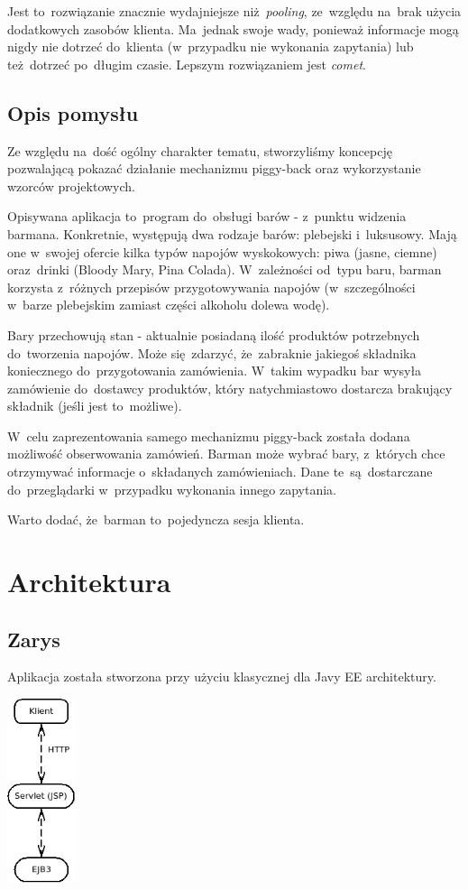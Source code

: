 \documentclass[11pt]{aghdpl}
\begin{document}
Jest to~rozwiązanie znacznie wydajniejsze niż~\textit{pooling}, ze~względu na~brak użycia dodatkowych zasobów klienta. Ma~jednak swoje wady, ponieważ informacje mogą nigdy nie dotrzeć do~klienta (w~przypadku nie wykonania zapytania) lub też~dotrzeć po~długim czasie. Lepszym rozwiązaniem jest \textit{comet}.

\section{Opis pomysłu}
Ze względu na~dość ogólny charakter tematu, stworzyliśmy koncepcję pozwalającą pokazać działanie mechanizmu piggy-back oraz wykorzystanie wzorców projektowych.

Opisywana aplikacja to~program do~obsługi barów - z~punktu widzenia barmana. Konkretnie, występują dwa rodzaje barów: plebejski i~luksusowy. Mają one w~swojej ofercie kilka typów napojów wyskokowych: piwa (jasne, ciemne) oraz~drinki (Bloody Mary, Pina Colada). W~zależności od~typu baru, barman korzysta z~różnych przepisów przygotowywania napojów (w~szczególności w~barze plebejskim zamiast części alkoholu dolewa wodę). 

Bary przechowują stan - aktualnie posiadaną ilość produktów potrzebnych do~tworzenia napojów. Może się~zdarzyć, że~zabraknie jakiegoś składnika koniecznego do~przygotowania zamówienia. W~takim wypadku bar wysyła zamówienie do~dostawcy produktów, który natychmiastowo dostarcza brakujący składnik (jeśli jest to~możliwe). 

W~celu zaprezentowania samego mechanizmu piggy-back została dodana możliwość obserwowania zamówień. Barman może wybrać bary, z~których chce otrzymywać informacje o~składanych zamówieniach. Dane te~są~dostarczane do~przeglądarki w~przypadku wykonania innego zapytania.

Warto dodać, że~barman to~pojedyncza sesja klienta.
\chapter{Architektura}
\section{Zarys}
Aplikacja została stworzona przy użyciu klasycznej dla Javy EE architektury.

\begin{center}
 \includegraphics[width=2cm]{arch}
\end{center}
\end{document}
